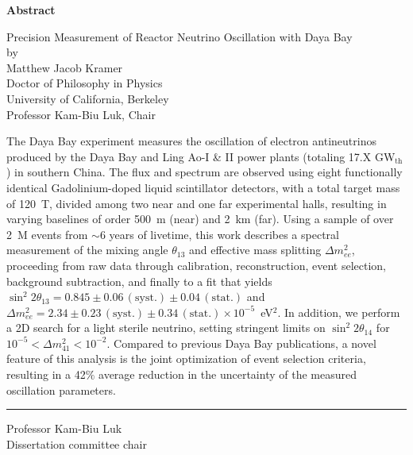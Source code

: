 \DoubleSpacing

\begin{center}
  \mylarge
  \textbf{Abstract}

  \vspace{1.5\baselineskip}
  Precision Measurement of Reactor Neutrino Oscillation with Daya Bay\\
  \vspace{\baselineskip} by\\
  \vspace{\baselineskip} Matthew Jacob Kramer\\
  Doctor of Philosophy in Physics\\
  University of California, Berkeley\\
  Professor Kam-Biu Luk, Chair
  \vspace{\baselineskip}
\end{center}

\normalsize
\MyDoubleSpacing
\noindent
%
The Daya Bay experiment measures the oscillation of electron antineutrinos
produced by the Daya Bay and Ling Ao-I \& II power plants (totaling 17.X
GW$_\mathrm{th}$) in southern China. The flux and spectrum are observed using
eight functionally identical Gadolinium-doped liquid scintillator detectors,
with a total target mass of 120~T, divided among two near and one far
experimental halls, resulting in varying baselines of order 500~m (near) and
2~km (far). Using a sample of over 2~M events from $\sim$6 years of livetime,
this work describes a spectral measurement of the mixing angle $\theta_{13}$ and
effective mass splitting $\Delta m^2_{ee}$, proceeding from raw data through
calibration, reconstruction, event selection, background subtraction, and
finally to a fit that yields $\sin^2 2\theta_{13} = 0.845 \pm
0.06\,\mathrm{(syst.)} \pm 0.04\,\mathrm{(stat.)}$ and $\Delta m^2_{ee} = 2.34
\pm 0.23\,\mathrm{(syst.)} \pm 0.34\,\mathrm{(stat.)} \times 10^{-5}$~eV$^2$. In
addition, we perform a 2D search for a light sterile neutrino, setting stringent
limits on $\sin^2 2\theta_{14}$ for $10^{-5} < \Delta m^2_{41} < 10^{-2}$.
Compared to previous Daya Bay publications, a novel feature of this analysis is
the joint optimization of event selection criteria, resulting in a 42$\%$
average reduction in the uncertainty of the measured oscillation parameters.

\SingleSpacing
\vspace{2.5\baselineskip}
\hfill
\begin{minipage}{0.4\textwidth}
  \hrule\vspace{0.4\baselineskip}
  Professor Kam-Biu Luk\\
  Dissertation committee chair
\end{minipage}

\clearpage